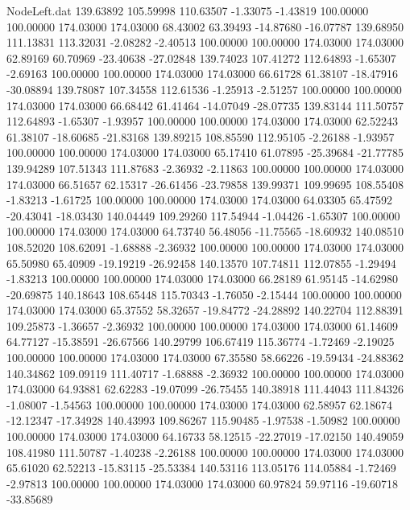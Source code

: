 \begin{filecontents}{NodeLeft.dat}
 139.63892  105.59998  110.63507    -1.33075   -1.43819  100.00000  100.00000  174.03000  174.03000   68.43002   63.39493  -14.87680  -16.07787
 139.68950  111.13831  113.32031    -2.08282   -2.40513  100.00000  100.00000  174.03000  174.03000   62.89169   60.70969  -23.40638  -27.02848
 139.74023  107.41272  112.64893    -1.65307   -2.69163  100.00000  100.00000  174.03000  174.03000   66.61728   61.38107  -18.47916  -30.08894
 139.78087  107.34558  112.61536    -1.25913   -2.51257  100.00000  100.00000  174.03000  174.03000   66.68442   61.41464  -14.07049  -28.07735
 139.83144  111.50757  112.64893    -1.65307   -1.93957  100.00000  100.00000  174.03000  174.03000   62.52243   61.38107  -18.60685  -21.83168
 139.89215  108.85590  112.95105    -2.26188   -1.93957  100.00000  100.00000  174.03000  174.03000   65.17410   61.07895  -25.39684  -21.77785
 139.94289  107.51343  111.87683    -2.36932   -2.11863  100.00000  100.00000  174.03000  174.03000   66.51657   62.15317  -26.61456  -23.79858
 139.99371  109.99695  108.55408    -1.83213   -1.61725  100.00000  100.00000  174.03000  174.03000   64.03305   65.47592  -20.43041  -18.03430
 140.04449  109.29260  117.54944    -1.04426   -1.65307  100.00000  100.00000  174.03000  174.03000   64.73740   56.48056  -11.75565  -18.60932
 140.08510  108.52020  108.62091    -1.68888   -2.36932  100.00000  100.00000  174.03000  174.03000   65.50980   65.40909  -19.19219  -26.92458
 140.13570  107.74811  112.07855    -1.29494   -1.83213  100.00000  100.00000  174.03000  174.03000   66.28189   61.95145  -14.62980  -20.69875
 140.18643  108.65448  115.70343    -1.76050   -2.15444  100.00000  100.00000  174.03000  174.03000   65.37552   58.32657  -19.84772  -24.28892
 140.22704  112.88391  109.25873    -1.36657   -2.36932  100.00000  100.00000  174.03000  174.03000   61.14609   64.77127  -15.38591  -26.67566
 140.29799  106.67419  115.36774    -1.72469   -2.19025  100.00000  100.00000  174.03000  174.03000   67.35580   58.66226  -19.59434  -24.88362
 140.34862  109.09119  111.40717    -1.68888   -2.36932  100.00000  100.00000  174.03000  174.03000   64.93881   62.62283  -19.07099  -26.75455
 140.38918  111.44043  111.84326    -1.08007   -1.54563  100.00000  100.00000  174.03000  174.03000   62.58957   62.18674  -12.12347  -17.34928
 140.43993  109.86267  115.90485    -1.97538   -1.50982  100.00000  100.00000  174.03000  174.03000   64.16733   58.12515  -22.27019  -17.02150
 140.49059  108.41980  111.50787    -1.40238   -2.26188  100.00000  100.00000  174.03000  174.03000   65.61020   62.52213  -15.83115  -25.53384
 140.53116  113.05176  114.05884    -1.72469   -2.97813  100.00000  100.00000  174.03000  174.03000   60.97824   59.97116  -19.60718  -33.85689

\end{filecontents}
